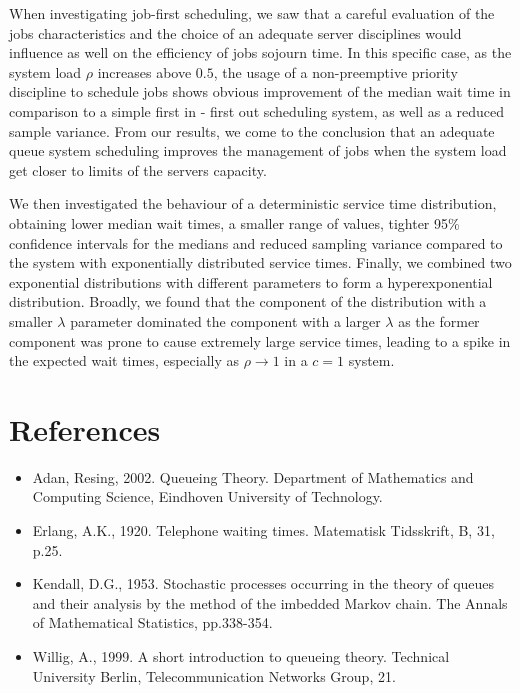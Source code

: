 \documentclass{article}
\begin{document}
    When investigating job-first scheduling, we saw that a careful evaluation of the jobs characteristics and the choice of an adequate server disciplines  would influence as well on the efficiency of jobs sojourn time. In this specific case, as the system load $\rho$ increases above $0.5$, the usage of a non-preemptive priority discipline to schedule jobs shows obvious improvement of the median wait time in comparison to a simple first in - first out scheduling system, as well as a reduced sample variance. From our results, we come to the conclusion that an adequate queue system scheduling improves the management of jobs when the system load get closer to limits of the servers capacity.

    We then investigated the behaviour of a deterministic service time distribution, obtaining lower median wait times, a smaller range of values, tighter 95\% confidence intervals for the medians and reduced sampling variance compared to the system with exponentially distributed service times. Finally, we combined two exponential distributions with different parameters to form a hyperexponential distribution. Broadly, we found that the component of the distribution with a smaller $\lambda$ parameter dominated the component with a larger $\lambda$ as the former component was prone to cause extremely large service times, leading to a spike in the expected wait times, especially as $\rho \rightarrow{1}$ in a $c = 1$ system.


    \clearpage

    \section*{References}

    \begin{itemize}
        \item[] Adan, Resing, 2002. Queueing Theory. Department of Mathematics and Computing Science, Eindhoven University of Technology.
        \item[] Erlang, A.K., 1920. Telephone waiting times. Matematisk Tidsskrift, B, 31, p.25.
        \item[] Kendall, D.G., 1953. Stochastic processes occurring in the theory of queues and their analysis by the method of the imbedded Markov chain. The Annals of Mathematical Statistics, pp.338-354.
        \item[] Willig, A., 1999. A short introduction to queueing theory. Technical University Berlin, Telecommunication Networks Group, 21.
    \end{itemize}

    \clearpage
\end{document}
